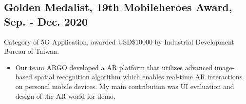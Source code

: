 \documentclass[12pt]{article}
\begin{document}
        \subsection*{Golden Medalist, 19th Mobileheroes Award, Sep. - Dec. 2020}
        {\sffamily
        {\footnotesize Category of 5G Application, awarded USD\$10000 by Industrial Development Bureau of Taiwan.}
        \begin{itemize}
            \item Our team ARGO developed a AR platform that utilizes advanced image-based spatial recognition algorithm which enables real-time AR interactions on personal mobile devices. My main contribution was UI evaluation and design of the AR world for demo.   
        \end{itemize}
        }
        
\end{document}
